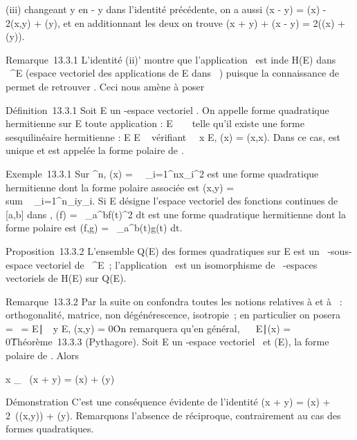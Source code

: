 \documentclass[]{article}
\begin{document}
(iii) changeant y en - y dans l'identité précédente, on a aussi \Phi(x - y)
= \Phi(x) - 2\phi(x,y) + \Phi(y), et en additionnant les deux on trouve \Phi(x + y)
+ \Phi(x - y) = 2(\Phi(x) + \Phi(y)).

Remarque~13.3.1 L'identité (ii)' montre que l'application
\phi\mapsto~\Phi est in\jmathective de H(E) dans ~^E
(espace vectoriel des applications de E dans ~) puisque la connaissance
de \Phi permet de retrouver \phi. Ceci nous amène à poser

Définition~13.3.1 Soit E un -espace vectoriel . On appelle forme
quadratique hermitienne sur E toute application \Phi : E \rightarrow~ ~ telle qu'il
existe une forme sesquilinéaire hermitienne \phi : E \times E \rightarrow~  vérifiant
\forall~~x \in E, \Phi(x) = \phi(x,x). Dans ce cas, \phi est
unique et est appelée la forme polaire de \Phi.

Exemple~13.3.1 Sur ^n, \Phi(x) =\
\sum ~
\_i=1^n\textbar{}x\_i\textbar{}^2 est
une forme quadratique hermitienne dont la forme polaire associée est
\phi(x,y) = \\sum ~
\_i=1^n\overlinex\_iy\_i.
Si E désigne l'espace vectoriel des fonctions continues de {[}a,b{]}
dans \mathbb{C}, \Phi(f) =\int ~
\_a^b\textbar{}f(t)\textbar{}^2 dt est une forme
quadratique hermitienne dont la forme polaire est \phi(f,g)
=\int ~
\_a^b\overlinef(t)g(t) dt.

Proposition~13.3.2 L'ensemble Q(E) des formes quadratiques sur E est un
~-sous-espace vectoriel de ~^E~; l'application
\phi\mapsto~\Phi est un isomorphisme de \mathbb{R}~-espaces
vectoriels de H(E) sur Q(E).

Remarque~13.3.2 Par la suite on confondra toutes les notions relatives à
\phi et à \Phi~: orthogonalité, matrice, non dégénérescence, isotropie~; en
particulier on posera
\mathrmKer~\Phi
= \mathrmKer~\phi =
\x \in
E∣\forall~~y \in E, \phi(x,y) =
0\. On remarquera qu'en général,
\mathrmKer\Phi\mathrel\neq~~\x
\in E∣\Phi(x) = 0\.

Théorème~13.3.3 (Pythagore). Soit E un -espace vectoriel ~et \Phi \inQ(E), \phi
la forme polaire de \Phi. Alors

x \bot\_\phiy \rigtharrow~ \Phi(x + y) = \Phi(x) + \Phi(y)

Démonstration C'est une conséquence évidente de l'identité \Phi(x + y) =
\Phi(x) + 2\mathrmRe~(\phi(x,y)) +
\Phi(y). Remarquons l'absence de réciproque, contrairement au cas des
formes quadratiques.
\end{document}
